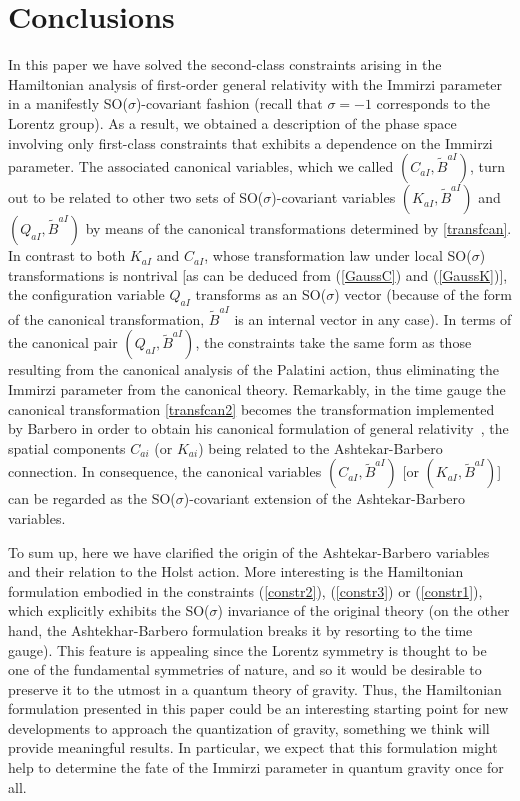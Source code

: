 \documentclass[aps,prd,reprint,showpacs,longbibliography,superscriptaddress, groupedaddres,
titlepage,nofootinbib]{revtex4-1} %
\begin{document}
\section{Conclusions}

In this paper we have solved the second-class constraints arising in the Hamiltonian analysis of first-order general relativity with the Immirzi parameter in a manifestly SO($\sigma$)-covariant fashion (recall that $\sigma=-1$ corresponds to the Lorentz group). As a result, we obtained a description of the phase space involving only first-class constraints that exhibits a dependence on the Immirzi parameter. The associated canonical variables, which we called 
$(C_{aI},\tilde{B}^{aI})$, turn out to be related to other two sets of SO($\sigma$)-covariant variables $(K_{aI},\tilde{B}^{aI})$ and $(Q_{aI},\tilde{B}^{aI})$ by means of the canonical transformations determined by \eqref{transfcan}. In contrast to both $K_{aI}$ and $C_{aI}$, whose transformation law under local SO($\sigma$) transformations is nontrival [as can be deduced from (\ref{GaussC}) and (\ref{GaussK})], the configuration variable $Q_{aI}$ transforms as an SO($\sigma$) vector (because of the form of the canonical transformation, $\tilde{B}^{aI}$ is an internal vector in any case). In terms of the canonical pair $(Q_{aI},\tilde{B}^{aI})$, the constraints take the same form as those resulting from the canonical analysis of the Palatini action, thus eliminating the Immirzi parameter from the canonical theory. Remarkably, in the time gauge the canonical transformation \eqref{transfcan2} becomes the transformation implemented by Barbero in order to obtain his canonical formulation of general relativity~\cite{Barbero}, the spatial components $C_{ai}$ (or $K_{ai}$) being related to the Ashtekar-Barbero connection. In consequence, the canonical variables $(C_{aI},\tilde{B}^{aI})$ [or $(K_{aI},\tilde{B}^{aI})$] can be regarded as the SO($\sigma$)-covariant extension of the Ashtekar-Barbero variables.


To sum up, here we have clarified the origin of the Ashtekar-Barbero variables and their relation to the Holst action. More interesting is the Hamiltonian formulation embodied in the constraints (\ref{constr2}), (\ref{constr3}) or (\ref{constr1}), which explicitly exhibits the SO($\sigma$) invariance of the original theory (on the other hand, the Ashtekhar-Barbero formulation breaks it by resorting to the time gauge). This feature is appealing since the Lorentz symmetry is thought to be one of the fundamental symmetries of nature, and so it would be desirable to preserve it to the utmost in a quantum theory of gravity. Thus, the Hamiltonian formulation presented in this paper could be an interesting starting point for new developments to approach the quantization of gravity, something we think will provide meaningful results. In particular, we expect that this formulation might help to determine the fate of the Immirzi parameter in quantum gravity once for all.
\end{document}
